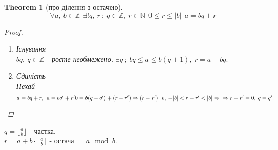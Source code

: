 \documentclass[a4paper,12pt]{bookest}
\newtheorem{theorem}{Theorem}[section]
\begin{document}
	\begin{theorem}[про ділення з остачею] 
	$$\forall a,\>b\in\mathbb{Z}\>\>\exists!q,\>r\>:\>q\in\mathbb{Z},\>r\in\mathbb{N}\>\>0\leq r\leq |b|\>\>a=bq+r$$
	\newpage
	\begin{proof}$ $
		\begin{enumerate}
			\item Існування\\
			$bq,\>q\in\mathbb{Z}$ - росте необмежено. $\exists q\>;\>bq\leq a\leq b(q+1),\>r=a-bq.$
			\item Єдиність\\
			Нехай $a=bq+r,\>\>a=bq'+r'\\
			0=b(q-q')+(r-r')\Rightarrow(r-r')\>\vdots\>b,\>-|b|<r-r'<|b|\Rightarrow\\\Rightarrow r-r'=0,\>q=q'.$
		\end{enumerate}
	\end{proof}
	\end{theorem}
	$q=\lfloor\frac{a}{b}\rfloor$ - частка.\\
	$r=a+b\cdot\lfloor\frac{a}{b}\rfloor$ - остача $=a\mod b$.
\end{document}
